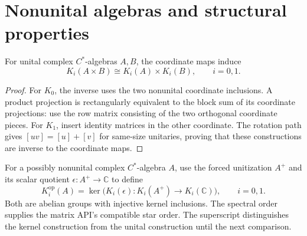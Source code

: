 \section{Nonunital algebras and structural properties}

\begin{proposition}\label{prop:k-product-decomposition}
For unital complex $C^*$-algebras $A,B$, the coordinate maps induce
\[
 K_i(A\times B)\cong K_i(A)\times K_i(B),\qquad i=0,1.
\]
\end{proposition}
\begin{proof}
\leanok
For $K_0$, the inverse uses the two nonunital coordinate inclusions.
A product projection is rectangularly equivalent to the block sum of its
coordinate projections: use the row matrix consisting of the two orthogonal
coordinate pieces. For $K_1$, insert identity matrices in the other coordinate.
The rotation path gives $[uv]=[u]+[v]$ for same-size unitaries, proving that
these constructions are inverse to the coordinate maps.
\end{proof}

\begin{definition}\label{def:operator-k-theory}
\leanok
For a possibly nonunital complex $C^*$-algebra $A$, use the forced unitization
$A^+$ and its scalar quotient $\epsilon:A^+\to\mathbb C$ to define
\[
 K_i^{\mathrm{op}}(A)=\ker\bigl(K_i(\epsilon):K_i(A^+)\to K_i(\mathbb C)\bigr),
 \qquad i=0,1.
\]
Both are abelian groups with injective kernel inclusions. The spectral order
supplies the matrix API's compatible star order. The superscript distinguishes
the kernel construction from the unital construction until the next comparison.
\end{definition}

